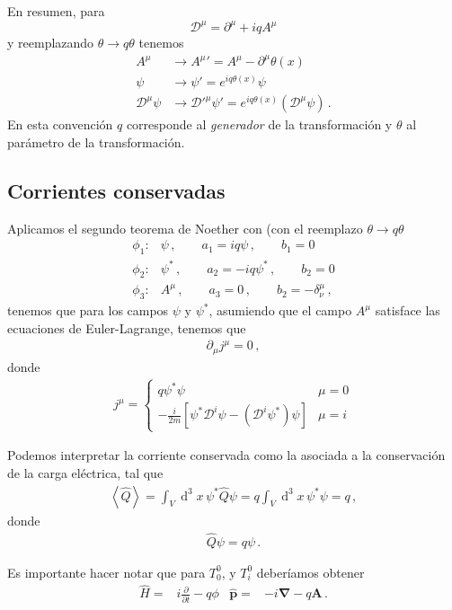 \begin{frame}
  En resumen, para 
\begin{equation}
  \mathcal{D}^\mu=\partial^\mu+iqA^\mu
\end{equation}
y reemplazando $\theta\to q\theta$ tenemos
\begin{align}
\label{eq:tfgl}
   A^\mu&\to{A^\mu}'=A^\mu-\partial^\mu\theta(x)\\
   \psi&\to \psi'=e^{iq\theta(x)}\psi\nonumber\\
  \mathcal{D}^\mu\psi&\to {\mathcal{D}'}^\mu\psi'=e^{iq\theta(x)}(\mathcal{D}^\mu\psi)\,.
\end{align}
En esta convención $q$ corresponde al \emph{generador} de la transformación y $\theta$ al parámetro de la transformación.
\end{frame}


\subsection{Corrientes conservadas}
\label{ref:cc}
\begin{frame}
Aplicamos el segundo teorema de Noether con (con el reemplazo $\theta\to q\theta$
\begin{align}
\label{eq:dpa}
  \phi_{1}:& \psi\,,\qquad a_{1}=iq \psi \,,\qquad b_1=0\nonumber\\
  \phi_{2}:& \psi^{*}\,,\qquad a_{2}=-iq\psi^{*}\,,\qquad b_2=0 \nonumber\\
  \phi_{3}:& A^{\mu}\,,\qquad a_{3}=0\,,\qquad b_2=-\delta^{\mu}_{\nu}\,,
\end{align}
tenemos que para los campos $\psi$ y $\psi^{*}$, asumiendo que el campo $A^{\mu}$ satisface las ecuaciones de Euler-Lagrange, tenemos que
\begin{align}
  \partial_{\mu}j^{\mu}=0\,,
\end{align}
donde
\begin{align}
  j^{\mu}=
  \begin{cases}
q \psi^{*}\psi & \mu=0\\
-\frac{i}{2m} \left[ \psi^{*}\mathcal{D}^i\psi-\left( \mathcal{D}^i\psi^{*} \right)\psi \right] & \mu=i
  \end{cases}
\end{align}

Podemos interpretar la corriente conservada como la asociada a la conservación de la carga eléctrica, tal que
\begin{align}
  \left\langle \widehat{Q} \right\rangle =\int_{V}\operatorname{d}^3x\, \psi^{*} \widehat{Q} \psi=q\int_{V}\operatorname{d}^3x\, \psi^{*} \psi=q\,,
\end{align}
donde
\begin{align}
  \widehat{Q} \psi=q\psi\,.
\end{align}


Es importante hacer notar que para  $T^0_0$, y $T^0_i$ deberíamos obtener
\begin{align}
  \widehat{H}=& i\frac{\partial}{\partial t}-q\phi & \widehat{\mathbf{p}}=&-i\boldsymbol{\nabla}-q\mathbf{A}\,.
\end{align}

\end{frame}

